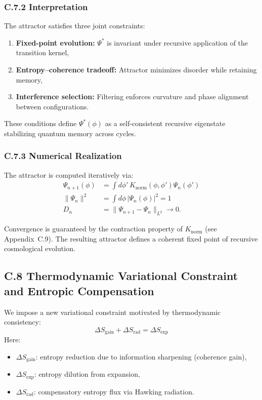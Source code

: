 \subsubsection*{C.7.2 Interpretation}

The attractor satisfies three joint constraints:
\begin{enumerate}
  \item \textbf{Fixed-point evolution:} \( \Psi^* \) is invariant under recursive application of the transition kernel,
  \item \textbf{Entropy–coherence tradeoff:} Attractor minimizes disorder while retaining memory,
  \item \textbf{Interference selection:} Filtering enforces curvature and phase alignment between configurations.
\end{enumerate}

These conditions define \( \Psi^*(\phi) \) as a self-consistent recursive eigenstate stabilizing quantum memory across cycles.

\subsubsection*{C.7.3 Numerical Realization}

The attractor is computed iteratively via:
\begin{align}
\Psi_{n+1}(\phi) &= \int d\phi' \, K_{\text{norm}}(\phi, \phi') \Psi_n(\phi') \\
\|\Psi_n\|^2 &= \int d\phi \, |\Psi_n(\phi)|^2 = 1 \\
D_n &= \| \Psi_{n+1} - \Psi_n \|_{L^2} \to 0.
\end{align}

Convergence is guaranteed by the contraction property of \( K_{\text{norm}} \) (see Appendix~C.9). The resulting attractor defines a coherent fixed point of recursive cosmological evolution.
\subsection*{C.8 Thermodynamic Variational Constraint and Entropic Compensation}
\label{appendix:C8}

We impose a new variational constraint motivated by thermodynamic consistency:
\begin{equation}
\Delta S_{\text{gain}} + \Delta S_{\text{rad}} = \Delta S_{\text{exp}}
\end{equation}
Here:
\begin{itemize}
  \item \( \Delta S_{\text{gain}} \): entropy reduction due to information sharpening (coherence gain),
  \item \( \Delta S_{\text{exp}} \): entropy dilution from expansion,
  \item \( \Delta S_{\text{rad}} \): compensatory entropy flux via Hawking radiation.
\end{itemize}

